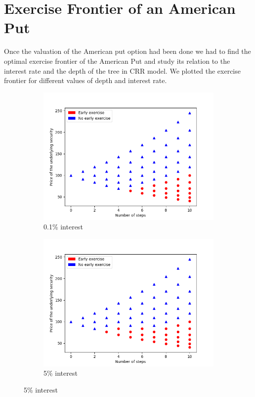 \documentclass[12pt]{report}
\begin{document}
\section*{Exercise Frontier of an American Put}
Once the valuation of the American put option had been done we had to find the optimal exercise frontier of the American Put and study its relation to the interest rate and the depth of the tree in CRR model. We plotted the exercise frontier for different values of depth and interest rate.
\begin{small}
\begin{figure}[H]
	\begin{subfigure}{.5\textwidth}
		\centering
		\includegraphics[width=.8\linewidth]{plots/n_10_r_001.png}  
		\caption{0.1\% interest}
		\label{fig1:sub-first}
	\end{subfigure}
	\begin{subfigure}{.5\textwidth}
		\centering
		\includegraphics[width=.8\linewidth]{plots/n_10_r_005.png}  
		\caption{5\% interest}
		\label{fig1:sub-second}
	\end{subfigure}
	

\end{figure}
\end{small}
\end{document}
